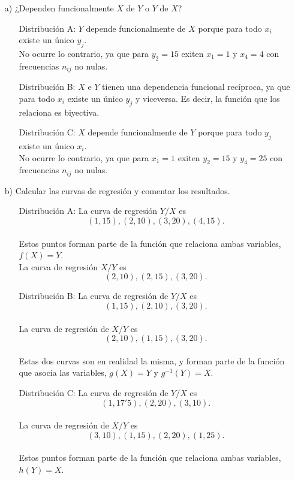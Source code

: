 \documentclass[10pt]{article}
\begin{document}
\begin{itemize}

\item[a)]¿Dependen funcionalmente $X$ de $Y$ o $Y$ de $X$?

\begin{itemize}

\item[Distribución A:]$Y$ depende funcionalmente de $X$ porque para todo $x_i$ existe un único $y_j$.
\\No ocurre lo contrario, ya que para $y_2 = 15$ exiten $x_1 = 1$ y $x_4 = 4$ con frecuencias $n_{ij}$ no nulas.

\item[Distribución B:]$X$ e $Y$ tienen una dependencia funcional recíproca, ya que para todo $x_i$ existe un único $y_j$ y viceversa.
Es decir, la función que los relaciona es biyectiva.

\item[Distribución C:]$X$ depende funcionalmente de $Y$ porque para todo $y_j$ existe un único $x_i$.
\\No ocurre lo contrario, ya que para $x_1 = 1$ exiten $y_2 = 15$ y $y_4 = 25$ con frecuencias $n_{ij}$ no nulas.

\end{itemize}

\item[b)]Calcular las curvas de regresión y comentar los resultados.

\begin{itemize}

\item[Distribución A:]La curva de regresión $Y/X$ es $$(1, 15), (2, 10), (3, 20), (4, 15).$$
\\Estos puntos forman parte de la función que relaciona ambas variables, $f(X) = Y$.
\\La curva de regresión $X/Y$ es $$(2, 10), (2, 15), (3, 20).$$

\item[Distribución B:]La curva de regresión de $Y/X$ es $$(1,15), (2,10), (3,20).$$
\\La curva de regresión de $X/Y$ es $$(2,10), (1,15), (3,20).$$
\\Estas dos curvas son en realidad la misma, y forman parte de la función que asocia las variables, $g(X) = Y$ y $g^{-1}(Y) = X$.

\item[Distribución C:]La curva de regresión de $Y/X$ es $$(1, 17'5), (2, 20), (3, 10).$$
\\La curva de regresión de $X/Y$ es $$(3, 10), (1, 15), (2, 20), (1, 25).$$
\\Estos puntos forman parte de la función que relaciona ambas variables, $h(Y) = X$.

\end{itemize}

\end{itemize}
\end{document}
